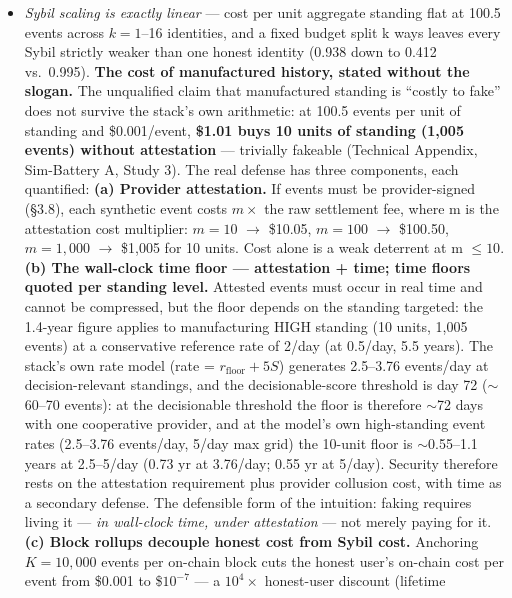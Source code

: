 \documentclass[11pt,twocolumn]{article}
\providecommand{\tightlist}{\setlength{\itemsep}{0pt}\setlength{\parskip}{0pt}}
\begin{document}
\begin{itemize}
  \begin{itemize}
  \tightlist
  \item
    \emph{Sybil scaling is exactly linear} --- cost per unit aggregate
    standing flat at 100.5 events across \(k = 1\)--16 identities, and a
    fixed budget split k ways leaves every Sybil strictly weaker than
    one honest identity (0.938 down to 0.412 vs.~0.995). \textbf{The
    cost of manufactured history, stated without the slogan.} The unqualified
    claim that manufactured standing is ``costly to fake'' does not survive the
    stack's own arithmetic: at 100.5 events per unit of standing and
    \$0.001/event, \textbf{\$1.01 buys 10 units of standing (1,005 events)
    without attestation} --- trivially fakeable
    (Technical Appendix, Sim-Battery A, Study 3). The real defense has
    three components, each quantified: \textbf{(a) Provider
    attestation.} If events must be provider-signed (§3.8), each
    synthetic event costs \(m\times\) the raw settlement fee, where m is
    the attestation cost multiplier: \(m = 10\) \(\to\) \$10.05,
    \(m = 100\) \(\to\) \$100.50, \(m = 1,000\) \(\to\) \$1,005 for 10
    units. Cost alone is a weak deterrent at m \(\leq 10.\) \textbf{(b)
    The wall-clock time floor --- attestation + time; time floors quoted
    per standing level.} Attested events
    must occur in real time and cannot be compressed, but the floor
    depends on the standing targeted: the 1.4-year figure applies to
    manufacturing HIGH standing (10 units, 1,005 events) at a
    conservative reference rate
    of 2/day (at 0.5/day, 5.5 years). The stack's own rate model
    (rate = \(r_{\mathrm{floor}} + 5S\)) generates 2.5--3.76 events/day
    at decision-relevant standings, and the decisionable-score threshold
    is day 72 (\(\sim\)60--70 events): at the decisionable threshold the
    floor is therefore \(\sim\)72 days with one cooperative provider,
    and at the model's own high-standing event rates (2.5--3.76
    events/day, 5/day max grid) the 10-unit
    floor is \(\sim\)0.55--1.1 years at 2.5--5/day (0.73 yr at 3.76/day; 0.55 yr at 5/day). Security therefore rests on the
    attestation requirement plus provider collusion cost, with time as a
    secondary defense.
    The defensible form of the intuition: faking requires
    living it --- \emph{in wall-clock time, under attestation} --- not
    merely paying for it. \textbf{(c) Block rollups decouple honest cost
    from Sybil cost.} Anchoring \(K = 10,000\) events per on-chain block
    cuts the honest user's on-chain cost per event from \$0.001 to
    \$\(10^{-7}\) --- a \(10^{4}\times\) honest-user discount (lifetime

\end{itemize}
\end{itemize}
\end{document}
